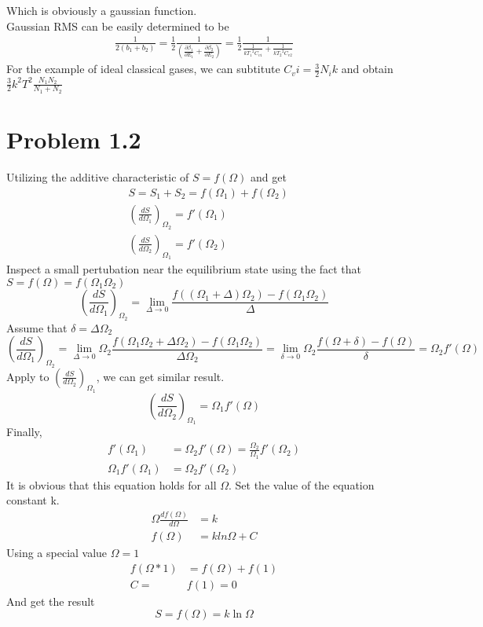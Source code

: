 \documentclass{article}
\begin{document}
Which is obviously a gaussian function.\\
Gaussian RMS can be easily determined to be
\begin{align}
\frac{1}{2(b_1+b_2)}=\frac{1}{2}\frac{1}{(\frac{\partial \beta_1}{\partial E_1}+\frac{\partial \beta_2}{\partial E_2})}=\frac{1}{2}\frac{1}{\frac{1}{k{T_1}^2C_{v1}}+\frac{1}{k{T_2}^2C_{v2}}}
\end{align}
For the example of ideal classical gases, we can subtitute $C_vi=\frac{3}{2}N_ik$ and obtain $\frac{3}{2}k^2T^2\frac{N_1N_2}{N_1+N_2}$\\

\section*{Problem 1.2}
Utilizing the additive characteristic of $S=f(\Omega)$ and get
\begin{align}
&S=S_1+S_2=f(\Omega_1)+f(\Omega_2)\\
&(\frac{dS}{d\Omega_1})_{\Omega_2}=f'(\Omega_1)\\
&(\frac{dS}{d\Omega_2})_{\Omega_1}=f'(\Omega_2)
\end{align}
Inspect a small pertubation near the equilibrium state using the fact that $S=f(\Omega)=f(\Omega_1\Omega_2)$
\begin{equation}
(\frac{dS}{d\Omega_1})_{\Omega_2}=\lim_{\Delta\rightarrow 0}{\frac{f((\Omega_1+\Delta)\Omega_2)-f(\Omega_1\Omega_2)}{\Delta}}
\end{equation}
Assume that $\delta=\Delta\Omega_2$
\begin{equation}
(\frac{dS}{d\Omega_1})_{\Omega_2}=\lim_{\Delta\rightarrow 0}{\Omega_2\frac{f(\Omega_1\Omega_2+\Delta\Omega_2)-f(\Omega_1\Omega_2)}{\Delta\Omega_2}}=\lim_{\delta\rightarrow 0}{\Omega_2\frac{f(\Omega+\delta)-f(\Omega)}{\delta}}=\Omega_2f'(\Omega)
\end{equation}
Apply to $(\frac{dS}{d\Omega_2})_{\Omega_1}$, we can get similar result.
\begin{equation}
(\frac{dS}{d\Omega_2})_{\Omega_1}=\Omega_1f'(\Omega)
\end{equation}
Finally,
\begin{align}
f'(\Omega_1)&=\Omega_2f'(\Omega)=\frac{\Omega_2}{\Omega_1}f'(\Omega_2)\\
\Omega_1f'(\Omega_1)&=\Omega_2f'(\Omega_2)
\end{align}
It is obvious that this equation holds for all $\Omega$. Set the value of the equation constant k.
\begin{align}
\Omega\frac{df(\Omega)}{d\Omega}&=k\\
f(\Omega)&=kln\Omega+C
\end{align}
Using a special value $\Omega=1$
\begin{align}
f(\Omega*1)&=f(\Omega)+f(1)\\
C=&f(1)=0
\end{align}
And get the result
\begin{equation}
S=f(\Omega)=k\ln\Omega
\end{equation}
\end{document}
